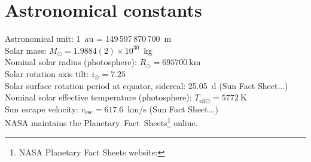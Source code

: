 


\section{Astronomical constants}
\label{sec:astronomical_constants}

Astronomical unit: 1~au = 149\,597\,870\,700~m \citep{USNO2015}\\ %
Solar mass: $M_\odot = 1.9884(2)\times10^{30}$~kg \citep{USNO2015}\\ %
Nominal solar radius (photosphere): $R_\odot = \SI{695700}{\km}$ \citep{Mamajek2015}\\ %
Solar rotation axis tilt: $i_\odot = 7.25$\textdegree{} \citep{USNO2015}\\ %
Solar surface rotation period at equator, sidereal: 25.05~d (Sun Fact Sheet...)\\
Nominal solar effective temperature (photosphere): $T_{\text{eff}\odot} = \SI{5772}{\kelvin}$ \citep{Mamajek2015}\\
Sun escape velocity: $v_\text{esc} = 617.6$~km/s (Sun Fact Sheet...)\\


NASA maintains the Planetary~Fact~Sheets\footnote{NASA Planetary Fact Sheets website: } online.\\



